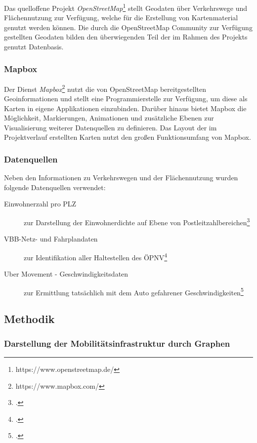 Das quelloffene Projekt \emph{OpenStreetMap}\footnote{https://www.openstreetmap.de/} stellt Geodaten über Verkehrswege und Flächennutzung zur Verfügung, welche für die Erstellung von Kartenmaterial genutzt werden können. Die durch die OpenStreetMap Community zur Verfügung gestellten Geodaten bilden den überwiegenden Teil der im Rahmen des Projekts genutzt Datenbasis.

\subsubsection{Mapbox}
\label{mapbox}

Der Dienst \emph{Mapbox}\footnote{https://www.mapbox.com/} nutzt die von OpenStreetMap bereitgestellten Geoinformationen und stellt eine Programmierstelle zur Verfügung, um diese als Karten in eigene Applikationen einzubinden. Darüber hinaus bietet Mapbox die Möglichkeit, Markierungen, Animationen und zusätzliche Ebenen zur Visualisierung weiterer Datenquellen zu definieren. Das Layout der im Projektverlauf erstellten Karten nutzt den großen Funktionsumfang von Mapbox.

\subsubsection{Datenquellen}
\label{datenquellen}

Neben den Informationen zu Verkehrswegen und der Flächennutzung wurden folgende Datenquellen verwendet:

\begin{description}
    \item[Einwohnerzahl pro PLZ] zur Darstellung der Einwohnerdichte auf Ebene von Postleitzahlbereichen\footcite{Einwohnerdaten}
    \item[VBB-Netz- und Fahrplandaten] zur Identifikation aller Haltestellen des \ac{ÖPNV}\footcite{Fahrplandaten}
    \item[Uber Movement - Geschwindigkeitsdaten] zur Ermittlung tatsächlich mit dem Auto gefahrener Geschwindigkeiten\footcite{Uberdaten}
\end{description}

\subsection{Methodik}
\label{methodik}

\subsubsection{Darstellung der Mobilitätsinfrastruktur durch Graphen}
\label{darstellung_der_mobiltaetsinfrastruktur_durch_graphen}

